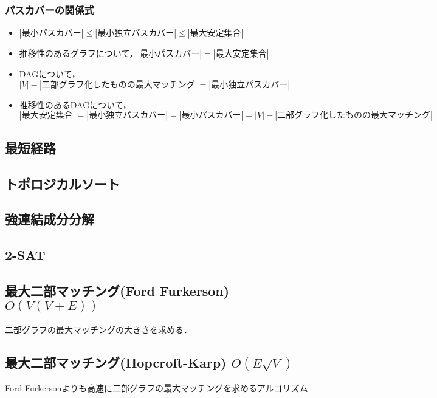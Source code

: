 \documentclass[landscape, twocolumn, 9pt]{jsarticle}
\begin{document}
\subsubsection{パスカバーの関係式}
\begin{itemize}
    \item $|最小パスカバー| \leq |最小独立パスカバー| \leq |最大安定集合|$
    \item 推移性のあるグラフについて，$|最小パスカバー| = |最大安定集合|$
    \item DAGについて，$|V| - |二部グラフ化したものの最大マッチング| = |最小独立パスカバー|$
    \item 推移性のあるDAGについて，$|最大安定集合| = |最小独立パスカバー| = |最小パスカバー| = |V| - |二部グラフ化したものの最大マッチング|$
\end{itemize}

\subsection{最短経路}


\subsection{トポロジカルソート}


\subsection{強連結成分分解}


\subsection{2-SAT}


\subsection{最大二部マッチング(Ford Furkerson) $O(V (V + E))$}
二部グラフの最大マッチングの大きさを求める．


\subsection{最大二部マッチング(Hopcroft-Karp) $O(E \sqrt{V})$}
 Ford Furkersonよりも高速に二部グラフの最大マッチングを求めるアルゴリズム

\end{document}
